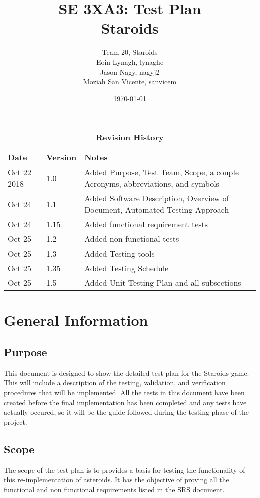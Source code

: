 \documentclass[12pt, titlepage]{article}
\title{SE 3XA3: Test Plan\\Staroids}
\author{Team 20, Staroids
		\\ Eoin Lynagh, lynaghe
		\\ Jason Nagy, nagyj2
		\\ Moziah San Vicente, sanvicem
}
\date{\today}
\begin{document}
\maketitle

\tableofcontents
\listoftables
\listoffigures

\begin{table}[h]
\caption{\bf Revision History}
\begin{tabularx}{\textwidth}{p{3cm}p{2cm}X}
\toprule {\bf Date} & {\bf Version} & {\bf Notes}\\
\midrule
Oct 22 2018 & 1.0 & Added Purpose, Test Team, Scope, a couple Acronyms, abbreviations, and symbols\\
Oct 24 & 1.1 & Added Software Description, Overview of Document, Automated Testing Approach\\
Oct 24 & 1.15 & Added functional requirement tests\\
Oct 25 & 1.2 & Added non functional tests\\
Oct 25 & 1.3 & Added Testing tools\\
Oct 25 & 1.35 & Added Testing Schedule\\
Oct 25 & 1.5 & Added Unit Testing Plan and all subsections\\
\bottomrule
\end{tabularx}
\end{table}

\newpage


\section{General Information}

\subsection{Purpose}
This document is designed to show the detailed test plan for the Staroids game. This will include a description of the testing, validation, and verification procedures that will be implemented. All the tests in this document have been created before the final implementation has been completed and any tests have actually occured, so it will be the guide followed during the testing phase of the project.

\subsection{Scope}
The scope of the test plan is to provides a basis for testing the functionality of this re-implementation of asteroids. It has the objective of proving all the functional and non functional requirements listed in the SRS document.
\end{document}
